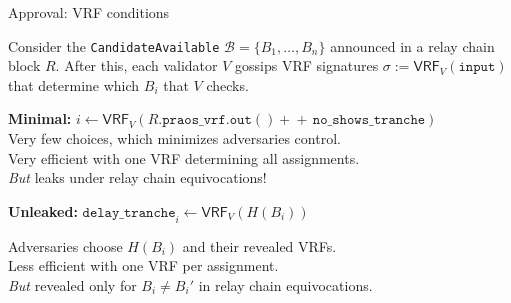 \documentclass{beamer}
\begin{document}
\begin{frame}[t]{Approval: VRF conditions}

Consider the \texttt{CandidateAvailable} $\mathcal{B} = \{ B_1,\ldots,B_n \}$ announced in a relay chain block $R$. 
After this, each validator $V$ gossips VRF signatures $\sigma := \mathsf{VRF}_V(\mathtt{input})$ that determine which $B_i$ that $V$ checks.

\bigskip

{\bf Minimal:} $i \leftarrow \mathsf{VRF}_V \left( R.\mathtt{praos\_vrf}.\mathtt{out}() +\!\!\!\!+\, \mathtt{no\_shows\_tranche} \right)$ \\

Very few choices, which minimizes adversaries control. \\

Very efficient with one VRF determining all assignments. \\

{\em But} leaks under relay chain equivocations!

\bigskip

{\bf Unleaked:} $\mathtt{delay\_tranche}_i \leftarrow \mathsf{VRF}_V \left( H(B_i) \right)$ 

Adversaries choose $H(B_i)$ and their revealed VRFs. \\

Less efficient with one VRF per assignment.  \\

{\em But} revealed only for $B_i \ne B_i'$ in relay chain equivocations.

\end{frame}
\end{document}
